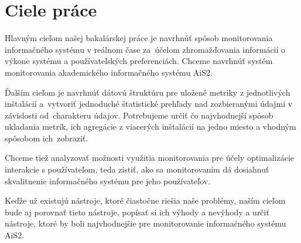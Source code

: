\documentclass[a4paper, upjsfrontpage, disablespecwarning, thesismargins, thesislinespacing]{rnthesis}
\begin{document}

\section{Ciele práce}


Hlavným cieľom našej bakalárskej práce je navrhnúť spôsob monitorovania informačného systému v reálnom čase za~úče\-lom zhromažďovania informácií o výkone systému a používateľských pre\-ferenciách. 
Chceme navrhnúť systém monitorovania akademického informačného systému AiS2.

Ďalším cieľom je navrhnúť dátovú štruktúru pre uložené metriky z jednotlivých inštalácií a~vytvoriť jednoduché štatistické prehľady nad zozbieranými údajmi v závis\-losti od~charakteru údajov.
Potrebujeme určiť čo najvhodnejší spôsob ukladania metrík, ich agregácie z viacerých inštalácií na jedno miesto a vhodným spôsobom ich~zobraziť.

Chceme tiež analyzovať možnosti využitia monitorovania pre účely optimalizácie interakcie s používateľom, teda zistiť, ako sa monitorovaním dá dosiahnuť skvalitnenie informačného systému pre jeho používateľov.

Keďže už existujú nástroje, ktoré čiastočne riešia naše problémy, naším cieľom bude aj porovnať tieto nástroje, popísať si ich výhody a nevýhody a určiť nástroje, ktoré by boli najvhodnejšie pre monitorovanie informačného systému AiS2.

\newpage

\end{document}
